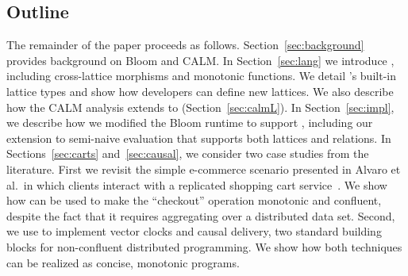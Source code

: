 % 

\subsection{Outline}
The remainder of the paper proceeds as follows.  Section~\ref{sec:background}
provides background on Bloom and CALM.  In Section~\ref{sec:lang} we introduce
\lang, including cross-lattice morphisms and monotonic functions. We detail \lang's built-in lattice types and show how developers can define new lattices.  We also describe how
the CALM analysis extends to \lang (Section~\ref{sec:calmL}).  In
Section~\ref{sec:impl}, we describe how we modified the Bloom runtime to support
\lang, including our extension to semi-naive evaluation that supports both
lattices and relations.  In Sections~\ref{sec:carts} and~\ref{sec:causal}, we
consider two case studies from the literature.  First we revisit the simple
e-commerce scenario presented in Alvaro et al.\ in which clients interact with a
replicated shopping cart service~\cite{Alvaro2011}. We show how \lang can be
used to make the ``checkout'' operation monotonic and confluent, despite the
fact that it requires aggregating over a distributed data set.  Second, we use
\lang to implement vector clocks and causal delivery, two standard building
blocks for non-confluent distributed programming. We show how both techniques
can be realized as concise, monotonic \lang programs.


